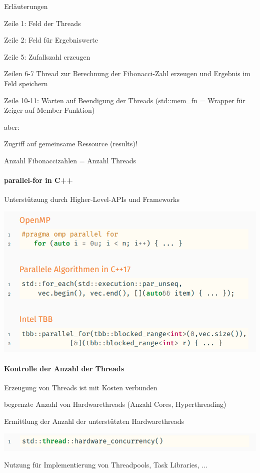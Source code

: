 \documentclass[10pt]{article}
\begin{document}
Erläuterungen
\begin{itemize*}
  \item Zeile 1: Feld der Threads
  \item Zeile 2: Feld für Ergebniswerte
  \item Zeile 5: Zufallszahl erzeugen
  \item Zeilen 6-7 Thread zur Berechnung der Fibonacci-Zahl erzeugen und Ergebnis im Feld speichern
  \item Zeile 10-11: Warten auf Beendigung der Threads (std::mem\_fn = Wrapper für Zeiger auf Member-Funktion)
  \item \color{orange} aber: \color{black}
  \begin{itemize*}
    \item Zugriff auf gemeinsame Ressource (results)!
    \item Anzahl Fibonaccizahlen = Anzahl Threads
  \end{itemize*}
\end{itemize*}

\paragraph{parallel-for in C++}

\begin{itemize*}
  \item Unterstützung durch Higher-Level-APIs und Frameworks
\end{itemize*}
\begin{center}
  \includegraphics[width=0.4\linewidth]{Assets/Programmierparadigmen-code-snippet-19}
\end{center}

\paragraph{Kontrolle der Anzahl der Threads}

\begin{itemize*}
  \item Erzeugung von Threads ist mit Kosten verbunden
  \item begrenzte Anzahl von Hardwarethreads (Anzahl Cores, Hyperthreading)
  \item Ermittlung der Anzahl der unterstützten Hardwarethreads
\end{itemize*}
\begin{center}
  \includegraphics[width=0.4\linewidth]{Assets/Programmierparadigmen-code-snippet-20}
\end{center}
\begin{itemize*}
  \item Nutzung für Implementierung von Threadpools, Task Libraries, ...
\end{itemize*}
\end{document}
